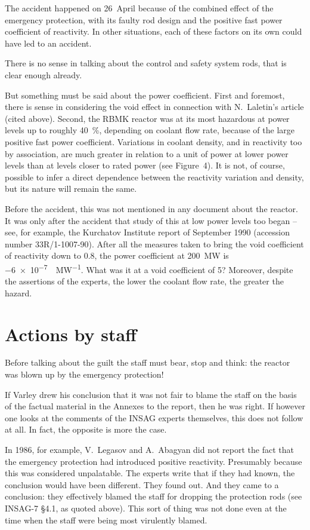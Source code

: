 \documentclass[openright]{bookest}
\begin{document}
The accident happened on 26~April because of the combined effect of the emergency protection, with its faulty rod design and the positive fast power coefficient of reactivity. In other situations, each of these factors on its own could have led to an accident.

There is no sense in talking about the control and safety system rods, that is clear enough already.

But something must be said about the power coefficient. First and foremost, there is sense in considering the void effect in connection with N.~Laletin's article (cited above). Second, the RBMK reactor was at its most hazardous at power levels up to roughly \qty{40}{\percent}, depending on coolant flow rate, because of the large positive fast power coefficient. Variations in coolant density, and in reactivity too by association, are much greater in relation to a unit of power at lower power levels than at levels closer to rated power (see Figure~4). It is not, of course, possible to infer a direct dependence between the reactivity variation and density, but its nature will remain the same.

Before the accident, this was not mentioned in any document about the reactor. It was only after the accident that study of this at low power levels too began -- see, for example, the Kurchatov Institute report of September 1990 (accession number 33R/1-1007-90). After all the measures taken to bring the void coefficient of reactivity down to \qty{+0.8}{\betaeff}, the power coefficient at \qty{200}{\mega\watt} is \qty{-6e-7}{\betaeff\per\mega\watt}. What was it at a void coefficient of \qty{+5}{\betaeff}? Moreover, despite the assertions of the experts, the lower the coolant flow rate, the greater the hazard.

\section*{Actions by staff}

Before talking about the guilt the staff must bear, stop and think: the reactor was blown up by the emergency protection!

If Varley drew his conclusion that it was not fair to blame the staff on the basis of the factual material in the Annexes to the report, then he was right. If however one looks at the comments of the INSAG experts themselves, this does not follow at all. In fact, the opposite is more the case.

In 1986, for example, V.~Legasov and A.~Abagyan did not report the fact that the emergency protection had introduced positive reactivity. Presumably because this was considered unpalatable. The experts write that if they had known, the conclusion would have been different. They found out. And they came to a conclusion: they effectively blamed the staff for dropping the protection rods (see INSAG-7 §4.1, as quoted above). This sort of thing was not done even at the time when the staff were being most virulently blamed.
\end{document}
